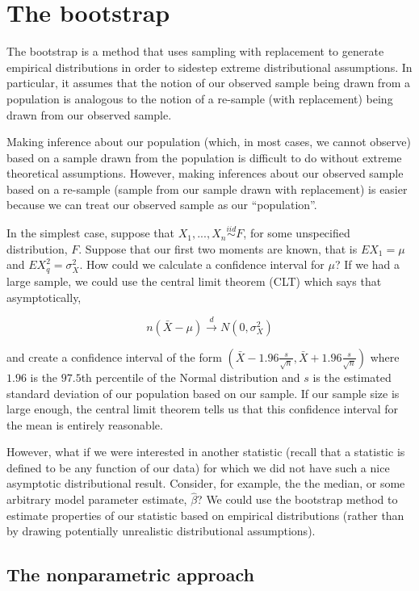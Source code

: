 \chapter{The bootstrap}
\label{ch:bootstrap}


The bootstrap is a method that uses sampling with replacement to generate empirical distributions in order to sidestep extreme distributional assumptions. In particular, it assumes that the notion of our observed sample being drawn from a population is analogous to the notion of a re-sample (with replacement) being drawn from our observed sample.

Making inference about our population (which, in most cases, we cannot observe) based on a sample drawn from the population is difficult to do without extreme theoretical assumptions. However, making inferences about our observed sample based on a re-sample (sample from our sample drawn with replacement) is easier because we can treat our observed sample as our ``population''. 

In the simplest case, suppose that $X_1, ..., X_n \overset{iid}{\sim} F$, for some unspecified distribution, $F$. Suppose that our first two moments are known, that is $EX_1 = \mu$ and $EX_q^2 = \sigma^2_X$. How could we calculate a confidence interval for $\mu$? If we had a large sample, we could use the central limit theorem (CLT) which says that asymptotically,

$$n (\bar{X} - \mu) \overset{d}{\rightarrow} N(0, \sigma_X^2)$$

and create a confidence interval of the form $(\bar{X} - 1.96 \frac{s}{\sqrt{n}}, \bar{X} + 1.96  \frac{s}{\sqrt{n}})$ where $1.96$ is the $97.5$th percentile of the Normal distribution and $s$ is the estimated standard deviation of our population based on our sample. If our sample size is large enough, the central limit theorem tells us that this confidence interval for the mean is entirely reasonable.


However, what if we were interested in another statistic (recall that a statistic is defined to be any function of our data) for which we did not have such a nice asymptotic distributional result. Consider, for example, the the median, or some arbitrary model parameter estimate, $\hat{\beta}$? We could use the bootstrap method to estimate properties of our statistic based on empirical distributions (rather than by drawing potentially unrealistic distributional assumptions). 


\section{The nonparametric approach}


